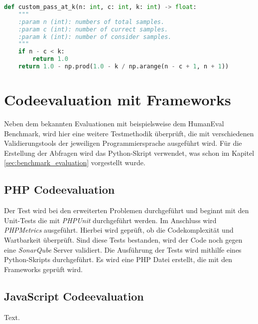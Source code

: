 \begin{lstlisting}[language=Python,label=lst:pass_at_k,caption={Berechnung der pass@k Metrik in Python}]
def custom_pass_at_k(n: int, c: int, k: int) -> float:
    """
    :param n (int): numbers of total samples.
    :param c (int): number of currect samples.
    :param k (int): number of consider samples.
    """
    if n - c < k:
        return 1.0
    return 1.0 - np.prod(1.0 - k / np.arange(n - c + 1, n + 1))
\end{lstlisting}


\section{Codeevaluation mit Frameworks}
Neben dem bekannten Evaluationen mit beispielsweise dem HumanEval Benchmark, wird hier eine weitere Testmethodik überprüft, die mit verschiedenen Validierungstools der jeweiligen Programmiersprache ausgeführt wird. Für die Erstellung der Abfragen wird das Python-Skript verwendet, was schon im Kapitel \ref{sec:benchmark_evaluation} vorgestellt wurde.

\subsection{PHP Codeevaluation}
Der Test wird bei den erweiterten Problemen durchgeführt und beginnt mit den Unit-Tests die mit \textit{PHPUnit} durchgeführt werden. Im Anschluss wird \textit{PHPMetrics} ausgeführt. Hierbei wird geprüft, ob die Codekomplexität und Wartbarkeit überprüft. Sind diese Tests bestanden, wird der Code noch gegen eine \textit{SonarQube} Server validiert. Die Ausführung der Tests wird mithilfe eines Python-Skripts durchgeführt. Es wird eine PHP Datei erstellt, die mit den Frameworks geprüft wird.

\subsection{JavaScript Codeevaluation}
Text.

